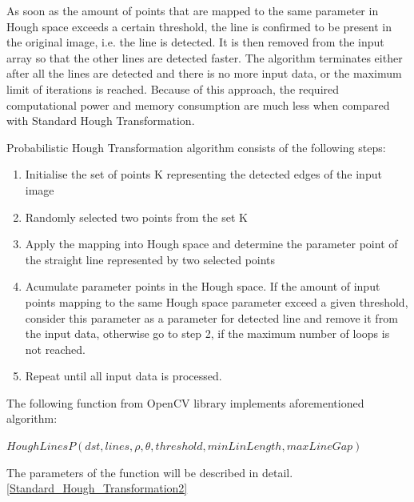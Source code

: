 As soon as the amount of points that are mapped to the same parameter in Hough space exceeds a certain threshold, the line is confirmed to be present in the original image, i.e. the line is detected. It is then removed from the input array so that the other lines are detected faster. The algorithm terminates either after all the lines are detected and there is no more input data, or the maximum limit of iterations is reached. Because of this approach, the required computational power and memory consumption are much less when compared with Standard Hough Transformation.


Probabilistic Hough Transformation algorithm consists of the following steps:

\begin{enumerate}

\item Initialise the set of points K representing the detected edges of the input image
\item  Randomly selected two points from the set K  
\item  Apply the mapping into Hough space and determine  the  parameter  point  of  the  straight  line  
represented by two selected points
\item  Acumulate parameter points in the Hough space. If  the amount of input points mapping to the same Hough space parameter exceed a given threshold, consider this parameter as a parameter for detected line and remove it from the input data, otherwise go to step 2, if the maximum number of loops is not reached.
\item  Repeat until all input data is processed.
\end{enumerate}

The following function from OpenCV library implements aforementioned algorithm:

  \begin{center}
  
$HoughLinesP(dst, lines, \rho, \theta, threshold, minLinLength, maxLineGap )  $

  \end{center}

The parameters of the function will be described in detail.\ref{Standard_Hough_Transformation2}
 
